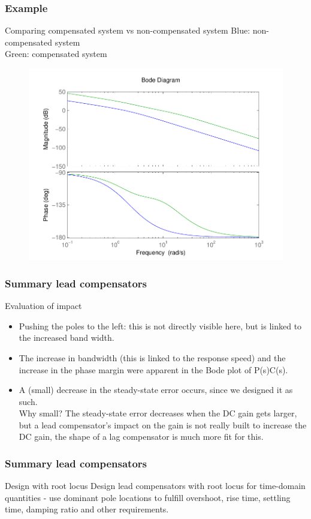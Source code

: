 \begin{frame}
	\frametitle{Example}
	\begin{block}{Comparing compensated system vs non-compensated system}
	Blue: non-compensated system \\
	Green: compensated system
	\begin{figure}
		\centering
		\includegraphics[width=0.5
		\linewidth]{bodesolutionexampleleadcomparing}
	\end{figure}
	\end{block}
\end{frame}

\begin{frame}
\frametitle{Summary lead compensators}
\begin{block}{Evaluation of impact}
\begin{itemize}
	\item Pushing the poles to the left: this is not directly visible here, but is linked to the increased band width.
	\item The increase in bandwidth (this is linked to the response speed) and the increase in the phase margin were apparent in the Bode plot of P(s)C(s).
	\item A (small) decrease in the steady-state error occurs, since we designed it as such. \\
	Why small? The steady-state error decreases when the DC gain gets larger, but a lead compensator’s impact on the gain is not really built to increase the DC gain, the shape of a lag compensator is much more fit for this.
\end{itemize}
\end{block}
\end{frame}

\begin{frame}
	\frametitle{Summary lead compensators}
	\begin{block}{Design with root locus}
	Design lead compensators with root locus for time-domain quantities  - use dominant pole locations to fulfill overshoot, rise time, settling time, damping ratio and other requirements.
	\end{block}
\end{frame}

